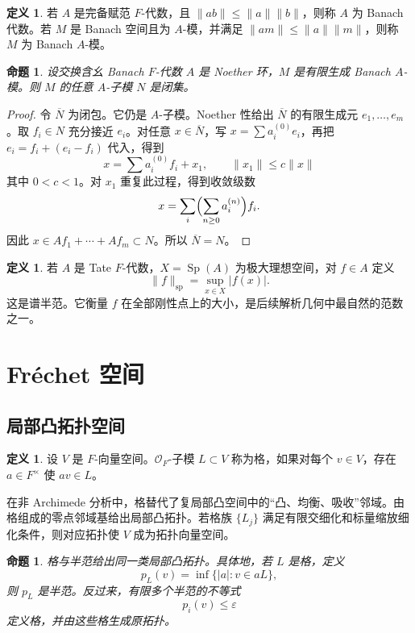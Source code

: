 \documentclass[11pt,a4paper,openany]{ctexbook}
\numberwithin{equation}{chapter}
\theoremstyle{plain}
\newtheorem{proposition}[theorem]{命题}
\theoremstyle{definition}
\newtheorem{definition}[theorem]{定义}
\theoremstyle{remark}
\begin{document}
\begin{definition}
若 $A$ 是完备赋范 $F$-代数，且 $\|ab\|\le\|a\|\|b\|$，则称 $A$ 为 Banach 代数。若 $M$ 是 Banach 空间且为 $A$-模，并满足 $\|am\|\le\|a\|\|m\|$，则称 $M$ 为 Banach $A$-模。
\end{definition}

\begin{proposition}
设交换含幺 Banach $F$-代数 $A$ 是 Noether 环，$M$ 是有限生成 Banach $A$-模。则 $M$ 的任意 $A$-子模 $N$ 是闭集。
\end{proposition}

\begin{proof}
令 $\overline N$ 为闭包。它仍是 $A$-子模。Noether 性给出 $\overline N$ 的有限生成元 $e_1,\ldots,e_m$。取 $f_i\in N$ 充分接近 $e_i$。对任意 $x\in\overline N$，写 $x=\sum a_i^{(0)}e_i$，再把 $e_i=f_i+(e_i-f_i)$ 代入，得到
\[
  x=\sum a_i^{(0)}f_i+x_1,\qquad \|x_1\|\le c\|x\|
\]
其中 $0<c<1$。对 $x_1$ 重复此过程，得到收敛级数
\[
  x=\sum_i\Bigl(\sum_{n\ge0}a_i^{(n)}\Bigr)f_i.
\]
因此 $x\in Af_1+\cdots+Af_m\subset N$。所以 $\overline N=N$。
\end{proof}

\begin{definition}
若 $A$ 是 Tate $F$-代数，$X=\operatorname{Sp}(A)$ 为极大理想空间，对 $f\in A$ 定义
\[
  \|f\|_{\mathrm{sp}}=\sup_{x\in X}|f(x)|.
\]
这是谱半范。它衡量 $f$ 在全部刚性点上的大小，是后续解析几何中最自然的范数之一。
\end{definition}

\section{Fréchet 空间}

\subsection{局部凸拓扑空间}

\begin{definition}
设 $V$ 是 $F$-向量空间。$\mathcal O_F$-子模 $L\subset V$ 称为格，如果对每个 $v\in V$，存在 $a\in F^\times$ 使 $av\in L$。
\end{definition}

在非 Archimede 分析中，格替代了复局部凸空间中的“凸、均衡、吸收”邻域。由格组成的零点邻域基给出局部凸拓扑。若格族 $\{L_j\}$ 满足有限交细化和标量缩放细化条件，则对应拓扑使 $V$ 成为拓扑向量空间。

\begin{proposition}
格与半范给出同一类局部凸拓扑。具体地，若 $L$ 是格，定义
\[
  p_L(v)=\inf\{|a|:v\in aL\},
\]
则 $p_L$ 是半范。反过来，有限多个半范的不等式
\[
  p_i(v)\le\varepsilon
\]
定义格，并由这些格生成原拓扑。
\end{proposition}
\end{document}
